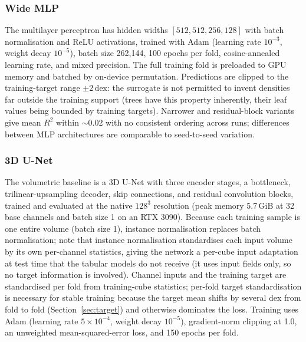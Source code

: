 \documentclass[fleqn,usenatbib]{rasti}
\newcommand{\dex}{\,\text{dex}}
\newcommand{\Rsq}{R^2}
\begin{document}
\subsubsection{Wide MLP}
The multilayer perceptron has hidden widths \([512, 512, 256, 128]\) with
batch normalisation \citep{Ioffe2015} and ReLU activations, trained with
Adam \citep{Kingma2015} (learning rate \(10^{-3}\), weight decay
\(10^{-5}\)), batch size 262,144, 100 epochs per fold, cosine-annealed
learning rate, and mixed precision. The full training fold is preloaded
to GPU memory and batched by on-device permutation. Predictions are
clipped to the training-target range \(\pm 2\dex\): the surrogate is not
permitted to invent densities far outside the training support (trees
have this property inherently, their leaf values being bounded by
training targets). Narrower and residual-block \citep{He2016} variants
give mean \(\Rsq\) within \(\sim\)0.02 with no consistent ordering across
runs; differences between MLP architectures are comparable to
seed-to-seed variation.

\subsubsection{3D U-Net}
\label{sec:cnn}
The volumetric baseline is a 3D U-Net \citep{Ronneberger2015,Cicek2016}
with three encoder stages, a bottleneck, trilinear-upsampling decoder,
skip connections, and residual convolution blocks, trained and evaluated
at the native \(128^3\) resolution (peak memory 5.7\,GiB at 32 base
channels and batch size 1 on an RTX 3090). Because each training sample
is one entire volume (batch size 1), instance normalisation
\citep{Ulyanov2017} replaces batch normalisation; note that instance
normalisation standardises each input volume by its own per-channel
statistics, giving the network a per-cube input adaptation at test time
that the tabular models do not receive (it uses input fields only, so no
target information is involved). Channel inputs and the training target
are standardised per fold from training-cube statistics; per-fold target
standardisation is necessary for stable training because the target mean
shifts by several dex from fold to fold (Section~\ref{sec:target}) and
otherwise dominates the loss. Training uses Adam (learning rate
\(5\times10^{-4}\), weight decay \(10^{-5}\)), gradient-norm clipping at
1.0, an unweighted mean-squared-error loss, and 150 epochs per fold.
\end{document}
